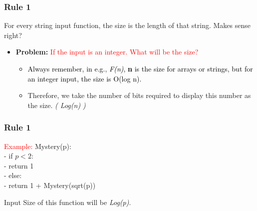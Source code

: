 \begin{frame}
    \frametitle{Rule 1}
    \vspace{0.3cm} %
    \begin{block}
          {For every string input function, the size is the length of that string. Makes sense right?}
    \end{block}
  
    \vspace{0.3cm}
    \begin{itemize}
        \item \textbf{Problem:} \textcolor{red}{If the input is an integer. What will be the size?}
        \vspace{0.3cm} %
        \begin{itemize}
            \item \textcolor{black}{Always remember, in e.g., \textit{F(n)}, \textbf{n} is the size for arrays or strings, but for an integer input, the size is O(log n).}
            \item Therefore, we take the number of bits required to display this number as the size. \textit{( Log(n) )}
        \end{itemize}
    \end{itemize}
    \vspace{0.5cm} %
\end{frame}


\begin{frame}
    \frametitle{Rule 1}
    \begin{block}{\textcolor{red}{Example:}}
          Mystery(p): \\
        - if $p < 2$: \\
        -  \quad  return 1 \\
        - else: \\
        -   \quad return 1 + Mystery(sqrt(p)) \\
    \end{block}
    \vspace{0.2cm}
    Input Size of this function will be \textit{Log(p)}.
    
\end{frame}


